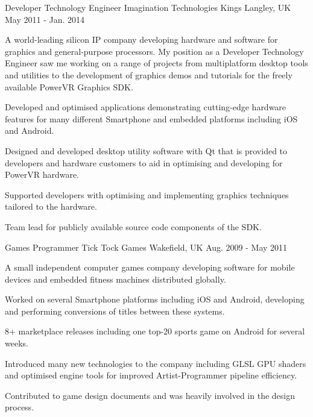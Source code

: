 \begin{cventries}
  \cventry
    {Developer Technology Engineer} %
    {Imagination Technologies} %
    {Kings Langley, UK} %
    {May 2011 - Jan. 2014} %
    {
      \begin{cventrysummary}
      A world-leading silicon IP company developing hardware and software for 
      graphics and general-purpose processors. My position as a Developer 
      Technology Engineer saw me working on a range of projects from 
      multiplatform desktop tools and utilities to the development of graphics
      demos and tutorials for the freely available PowerVR Graphics SDK.
      \end{cventrysummary}
      \begin{cvitems} %
        \item {Developed and optimised applications demonstrating cutting-edge hardware features for many different Smartphone and embedded platforms including iOS and Android.}
        \item {Designed and developed desktop utility software with Qt that is provided to developers and hardware customers to aid in optimising and developing for PowerVR hardware.}
        \item {Supported developers with optimising and implementing graphics techniques tailored to the hardware.}
        \item {Team lead for publicly available source code components of the SDK.}
      \end{cvitems}
    }

  \cventry
    {Games Programmer} %
    {Tick Tock Games} %
    {Wakefield, UK} %
    {Aug. 2009 - May 2011} %
    {
      \begin{cventrysummary}
      A small independent computer games company developing software for mobile
      devices and embedded fitness machines distributed globally.
      \end{cventrysummary}
      \begin{cvitems} %
        \item {Worked on several Smartphone platforms including iOS and Android, developing and performing conversions of titles between these systems. }
        \item {8+ marketplace releases including one top-20 sports game on Android for several weeks.}
        \item {Introduced many new technologies to the company including GLSL GPU shaders and optimised engine tools for improved Artist-Programmer pipeline efficiency.}
        \item {Contributed to game design documents and was heavily involved in the design process. }
      \end{cvitems}
    }

\end{cventries}
